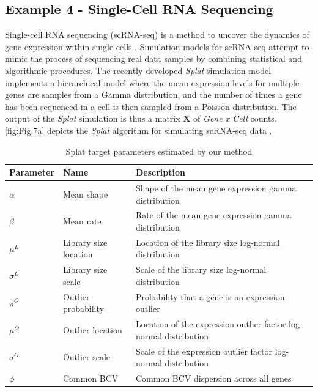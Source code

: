 \documentclass[9pt,twoside,lineno]{pnas-new}
\begin{document}
\subsection*{Example 4 - Single-Cell RNA Sequencing}
Single-cell RNA sequencing (scRNA-seq) is a method to uncover the dynamics of gene expression within single cells \cite{zappia2017splatter, ozsolak2011rna}. Simulation models for scRNA-seq attempt to mimic the process of sequencing real data samples by combining statistical and algorithmic procedures. The recently developed \textit{Splat} simulation model \cite{zappia2017splatter} implements a hierarchical model where the mean expression levels for multiple genes are samples from a Gamma distribution, and the number of times a gene has been sequenced in a cell is then sampled from a Poisson distribution. The output of the \textit{Splat} simulation is thus a matrix $\boldsymbol{X}$ of \textit{Gene x Cell} counts. \autoref{fig:Fig.7a} depicts the \textit{Splat} algorithm for simulating scRNA-seq data \cite{zappia2017splatter}.
\begin{table} 
\centering
\caption{Splat target parameters estimated by our method}
\begin{tabular}{lll}
Parameter & Name & Description\\
\midrule
$\alpha$ & Mean shape & Shape of the mean gene expression gamma distribution \\
$\beta$ & Mean rate & Rate of the mean gene expression gamma distribution \\
$\mu^{L}$ & Library size location & Location of the library size log-normal distribution \\
$\sigma^{L}$ & Library size scale & Scale of the library size log-normal distribution \\
$\pi^{O}$ & Outlier probability & Probability that a gene is an expression outlier \\
$\mu^{O}$ & Outlier location & Location of the expression outlier factor log-normal distribution \\
$\sigma^{O}$ & Outlier scale & Scale of the expression outlier factor log-normal distribution \\
$\phi$ & Common BCV & Common BCV dispersion across all genes \\
\bottomrule
\end{tabular}
\label{table:Table 1}
\end{table}
\end{document}

